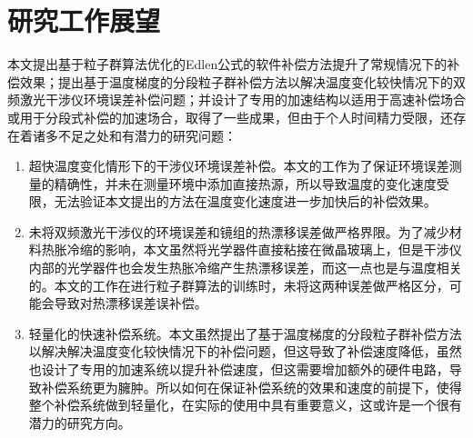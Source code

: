 \section{研究工作展望}
本文提出基于粒子群算法优化的Edlen公式的软件补偿方法提升了常规情况下的补偿效果；提出基于温度梯度的分段粒子群补偿方法以解决温度变化较快情况下的双频激光干涉仪环境误差补偿问题；并设计了专用的加速结构以适用于高速补偿场合或用于分段式补偿的加速场合，取得了一些成果，但由于个人时间精力受限，还存在着诸多不足之处和有潜力的研究问题：
\begin{enumerate}
    \item 超快温度变化情形下的干涉仪环境误差补偿。本文的工作为了保证环境误差测量的精确性，并未在测量环境中添加直接热源，所以导致温度的变化速度受限，无法验证本文提出的方法在温度变化速度进一步加快后的补偿效果。
    \item 未将双频激光干涉仪的环境误差和镜组的热漂移误差做严格界限。为了减少材料热胀冷缩的影响，本文虽然将光学器件直接粘接在微晶玻璃上，但是干涉仪内部的光学器件也会发生热胀冷缩产生热漂移误差，而这一点也是与温度相关的。本文的工作在进行粒子群算法的训练时，未将这两种误差做严格区分，可能会导致对热漂移误差误补偿。
    \item 轻量化的快速补偿系统。本文虽然提出了基于温度梯度的分段粒子群补偿方法以解决解决温度变化较快情况下的补偿问题，但这导致了补偿速度降低，虽然也设计了专用的加速系统以提升补偿速度，但这需要增加额外的硬件电路，导致补偿系统更为臃肿。所以如何在保证补偿系统的效果和速度的前提下，使得整个补偿系统做到轻量化，在实际的使用中具有重要意义，这或许是一个很有潜力的研究方向。
\end{enumerate}
